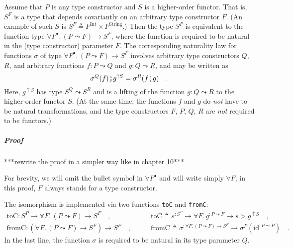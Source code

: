 Assume that $P$ is any type constructor and $S$ is a higher-order
functor.
That is, $S^{F}$ is a type that depends covariantly on an arbitrary
type constructor $F$. (An example of such $S$ is $S^{F}\triangleq F^{\text{Int}}\times F^{\text{String}}$.)
Then the type $S^{P}$ is equivalent to the function type $\forall F^{\bullet}.\,(P\leadsto F)\rightarrow S^{F}$,
where the function is required to be natural in the (type constructor)
parameter $F$. The corresponding naturality law for functions $\sigma$
of type $\forall F^{\bullet}.\,(P\leadsto F)\rightarrow S^{F}$ involves
arbitrary type constructors $Q$, $R$, and arbitrary functions $f:P\leadsto Q$
and $g:Q\leadsto R$, and may be written as
\begin{equation}
\sigma^{Q}(f)\bef g^{\uparrow S}=\sigma^{R}(f\bef g)\quad.\label{eq:assumed-naturality-of-argument-sigma}
\end{equation}
Here, $g^{\uparrow S}$ has type $S^{Q}\leadsto S^{R}$ and is a lifting
of the function $g:Q\leadsto R$ to the higher-order functor $S$.
(At the same time, the functions $f$ and $g$ do \emph{not} have
to be natural transformations, and the type constructors $F$, $P$,
$Q$, $R$ are \emph{not} required to be functors.)

\subparagraph{Proof}

{*}{*}{*}rewrite the proof in a simpler way like in chapter 10{*}{*}{*} 

For brevity, we will omit the bullet symbol in $\forall F^{\bullet}$
and will write simply $\forall F$; in this proof, $F$ always stands
for a type constructor.

The isomorphism is implemented via two functions \lstinline!toC!
and \lstinline!fromC!:
\begin{align*}
\text{toC}:S^{P}\rightarrow\forall F.\,(P\leadsto F)\rightarrow S^{F}\quad, & \quad\quad\text{toC}\triangleq s^{:S^{P}}\rightarrow\forall F.\,g^{:P\leadsto F}\rightarrow s\triangleright g^{\uparrow S}\quad,\\
\text{fromC}:(\forall F.\,(P\leadsto F)\rightarrow S^{F})\rightarrow S^{P}\quad, & \quad\quad\text{fromC}\triangleq\sigma^{:\forall F.\,(P\leadsto F)\rightarrow S^{F}}\rightarrow\sigma^{P}(\text{id}^{:P\leadsto P})\quad.
\end{align*}
In the last line, the function $\sigma$ is required to be natural
in its type parameter $Q$.

